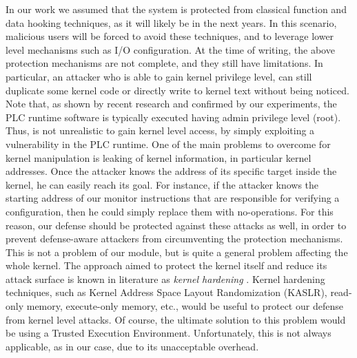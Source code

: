 In our work we assumed that the system is protected from classical function and data hooking techniques, as it will likely be in the next years.
In this scenario, malicious users will be forced to avoid these techniques, and to leverage lower level mechanisms such as I/O configuration.
At the time of writing, the above protection mechanisms are not complete, and they still have limitations.
In particular, an attacker who is able to gain kernel privilege level, can still duplicate some kernel code or directly write to kernel text without being noticed.
Note that, as shown by recent research \cite{siemens-s7} and confirmed by our experiments, the PLC runtime software is typically executed having admin privilege level (\ie root).
Thus, is not unrealistic to gain kernel level access, by simply exploiting a vulnerability in the PLC runtime.
One of the main problems to overcome for kernel manipulation is leaking of kernel information, in particular kernel addresses.
Once the attacker knows the address of its specific target inside the kernel, he can easily reach its goal.
For instance, if the attacker knows the starting address of our monitor instructions that are responsible for verifying a configuration,
then he could simply replace them with no-operations.
For this reason, our defense should be protected against these attacks as well, in order to prevent defense-aware attackers from circumventing the protection mechanisms.
This is not a problem of our module, but is quite a general problem affecting the whole kernel.
The approach aimed to protect the kernel itself and reduce its attack surface is known in literature as \emph{kernel hardening} \cite{hardening}.
Kernel hardening techniques, such as Kernel Address Space Layout Randomization (KASLR), read-only memory, execute-only memory, etc.,
would be useful to protect our defense from kernel level attacks. Of course, the ultimate solution to this problem would be using a Trusted Execution Environment.
Unfortunately, this is not always applicable, as in our case, due to its unacceptable overhead.

